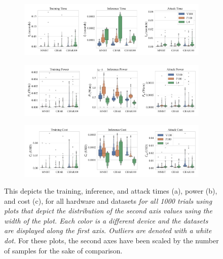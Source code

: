 \documentclass[conference]{IEEEtran}
\newcommand{\cm}[1]{\textit{{\color{blue}#1}}}
\begin{document}
\begin{figure}[h]
    \centering
    \begin{subfigure}[b]{\textwidth}
        \includegraphics[width=\linewidth,clip]{plots/combined/time.pdf}
        \caption{}
        \label{fig:time}
    \end{subfigure}
    \begin{subfigure}[b]{\textwidth}
        \includegraphics[width=\linewidth,clip]{plots/combined/power.pdf}
        \caption{}
        \label{fig:power}
    \end{subfigure}
    \begin{subfigure}[b]{\textwidth}
        \includegraphics[width=\linewidth,clip]{plots/combined/cost.pdf}
        \caption{}
        \label{fig:cost}
    \end{subfigure}
    \caption{This depicts the training, inference, and attack times (a), power (b), and cost (c), for all hardware and datasets \cm{ for all 1000 trials using plots that depict the distribution of the second axis values using the width of the plot. Each color is a different device and the datasets are displayed along the first axis. Outliers are denoted with a white dot.}
    For these plots, the second axes have been scaled by the number of samples for the sake of comparison.}
\end{figure}
\end{document}
